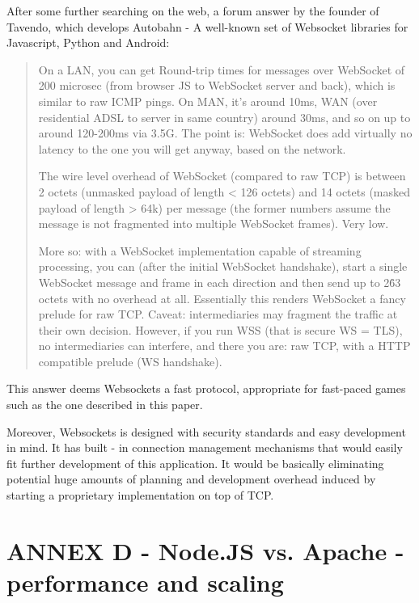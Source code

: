 \documentclass{article}
\begin{document}
After some further searching on the web, a forum answer\cite{websockets3} by the
founder of Tavendo, which develops Autobahn - A well-known set of Websocket libraries for
Javascript, Python and Android:\newline

\begin{quotation}
On a LAN, you can get Round-trip times for messages over WebSocket of 200
microsec (from browser JS to WebSocket server and back), which is similar to raw
ICMP pings. On MAN, it's around 10ms, WAN (over residential ADSL to server in
same country) around 30ms, and so on up to around 120-200ms via 3.5G. The point
is: WebSocket does add virtually no latency to the one you will get anyway,
based on the network.\newline

The wire level overhead of WebSocket (compared to raw TCP) is between 2 octets
(unmasked payload of length < 126 octets) and 14 octets (masked payload of
length > 64k) per message (the former numbers assume the message is not
fragmented into multiple WebSocket frames). Very low.\newline

More so: with a WebSocket implementation capable of streaming processing, you
can (after the initial WebSocket handshake), start a single WebSocket message
and frame in each direction and then send up to 2\^63 octets with no overhead at
all. Essentially this renders WebSocket a fancy prelude for raw TCP. Caveat:
intermediaries may fragment the traffic at their own decision. However, if you
run WSS (that is secure WS = TLS), no intermediaries can interfere, and there
you are: raw TCP, with a HTTP compatible prelude (WS handshake).
\end{quotation}

This answer deems Websockets a fast protocol, appropriate for fast-paced games
such as the one described in this paper.\newline

Moreover, Websockets is designed with security standards and easy development in
mind. It has built - in connection management mechanisms that would easily fit
further development of this application. It would be basically eliminating
potential huge amounts of planning and development overhead induced by starting
a proprietary implementation on top of TCP. \newline


\section{ANNEX D - Node.JS vs. Apache - performance and scaling}
\end{document}
